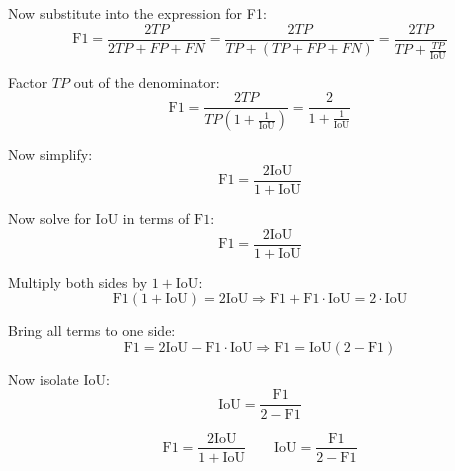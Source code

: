     Now substitute into the expression for F1:
    \[
    \text{F1} = \frac{2TP}{2TP + FP + FN} = \frac{2TP}{TP + (TP + FP + FN)} = \frac{2TP}{TP + \frac{TP}{\text{IoU}}}
    \]
    
    Factor \(TP\) out of the denominator:
    \[
    \text{F1} = \frac{2TP}{TP \left(1 + \frac{1}{\text{IoU}}\right)} = \frac{2}{1 + \frac{1}{\text{IoU}}}
    \]
    
    Now simplify:
    \[
    \text{F1} = \frac{2\text{IoU}}{1 + \text{IoU}}
    \]
    
    \noindent
    Now solve for \(\text{IoU}\) in terms of \(\text{F1}\):
    \[
    \text{F1} = \frac{2\text{IoU}}{1 + \text{IoU}}
    \]
    
    Multiply both sides by \(1 + \text{IoU}\):
    \[
    \text{F1}(1 + \text{IoU}) = 2\text{IoU}
    \Rightarrow \text{F1} + \text{F1} \cdot \text{IoU} = 2 \cdot \text{IoU}
    \]
    
    Bring all terms to one side:
    \[
    \text{F1} = 2\text{IoU} - \text{F1} \cdot \text{IoU}
    \Rightarrow \text{F1} = \text{IoU}(2 - \text{F1})
    \]
    
    Now isolate \(\text{IoU}\):
    \[
    \text{IoU} = \frac{\text{F1}}{2 - \text{F1}}
    \]
    
    \begin{equation}
    \boxed{
    \text{F1} = \frac{2\text{IoU}}{1 + \text{IoU}} \qquad
    \text{IoU} = \frac{\text{F1}}{2 - \text{F1}}
    }
    \label{eq:conversion}
\end{equation}


